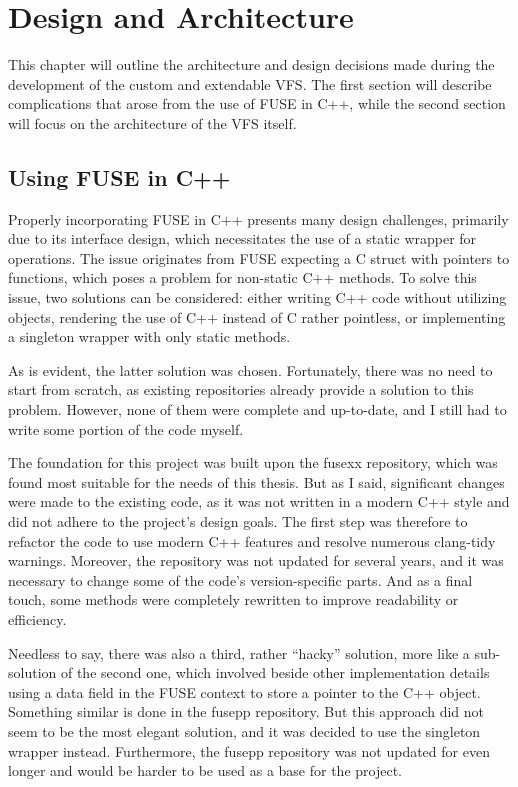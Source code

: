 \chapter{Design and Architecture}
\label{chap:design-and-architecture}

This chapter will outline the architecture and design decisions made during the development of the custom and extendable VFS\@.
The first section will describe complications that arose from the use of FUSE in C++, while the second section will focus on the architecture of the VFS itself.

\section{Using FUSE in C++}\label{sec:fuse-in-cpp}

Properly incorporating FUSE in C++ presents many design challenges, primarily due to its interface design, which necessitates the use of a static wrapper for operations.
The issue originates from FUSE expecting a C struct with pointers to functions, which poses a problem for non-static C++ methods.
To solve this issue, two solutions can be considered: either writing C++ code without utilizing objects, rendering the use of C++ instead of C rather pointless, or implementing a singleton wrapper with only static methods.

As is evident, the latter solution was chosen.
Fortunately, there was no need to start from scratch, as existing repositories already provide a solution to this problem.
However, none of them were complete and up-to-date, and I still had to write some portion of the code myself.

The foundation for this project was built upon the fusexx\cite{fusexx} repository, which was found most suitable for the needs of this thesis.
But as I said, significant changes were made to the existing code, as it was not written in a modern C++ style and did not adhere to the project's design goals.
The first step was therefore to refactor the code to use modern C++ features and resolve numerous clang-tidy warnings.
Moreover, the repository was not updated for several years, and it was necessary to change some of the code's version-specific parts.
And as a final touch, some methods were completely rewritten to improve readability or efficiency.

Needless to say, there was also a third, rather ``hacky'' solution, more like a sub-solution of the second one, which involved beside other implementation details using a data field in the FUSE context to store a pointer to the C++ object.
Something similar is done in the fusepp\cite{fusepp} repository.
But this approach did not seem to be the most elegant solution, and it was decided to use the singleton wrapper instead.
Furthermore, the fusepp repository was not updated for even longer and would be harder to be used as a base for the project.


